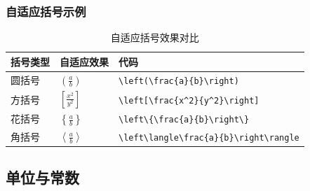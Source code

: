 \documentclass{article}
\begin{document}
\subsubsection{自适应括号示例}
\begin{table}[H]
      \centering
      \renewcommand{\arraystretch}{2.0}
      \begin{tabular}{>{\centering}p{2cm}>{\centering}p{2cm}>{\centering\arraybackslash}p{8cm}}
            \hline
            \textbf{括号类型} & \textbf{自适应效果}                         & \textbf{代码}                                      \\
            \hline
            圆括号           & $\left(\frac{a}{b}\right)$             & \lstinline|\left(\frac{a}{b}\right)|             \\
            \hline
            方括号           & $\left[\frac{x^2}{y^2}\right]$         & \lstinline|\left[\frac{x^2}{y^2}\right]|         \\
            \hline
            花括号           & $\left\{\frac{a}{b}\right\}$           & \lstinline|\left\{\frac{a}{b}\right\}|           \\
            \hline
            角括号           & $\left\langle\frac{a}{b}\right\rangle$ & \lstinline|\left\langle\frac{a}{b}\right\rangle| \\
            \hline
      \end{tabular}
      \caption{自适应括号效果对比}
\end{table}

\subsection{单位与常数}
\end{document}
